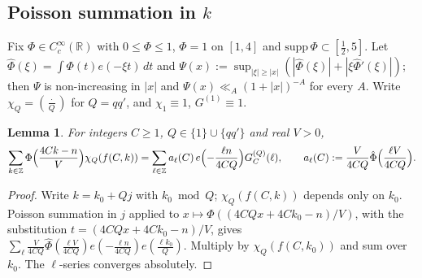 \documentclass[11pt,reqno]{amsart}
\newtheorem{lemma}[theorem]{Lemma}
\theoremstyle{definition}
\newcommand{\Z}{\mathbb Z}
\newcommand{\R}{\mathbb R}
\newcommand{\leg}[2]{\left(\frac{#1}{#2}\right)}
\begin{document}
\subsection{Poisson summation in $k$}
Fix $\Phi\in C_c^\infty(\R)$ with $0\le\Phi\le1$, $\Phi=1$ on $[1,4]$
and $\mathrm{supp}\,\Phi\subset[\frac12,5]$.  Let
$\hat\Phi(\xi)=\int\Phi(t)e(-\xi t)\,dt$ and
$\Psi(x):=\sup_{|\xi|\ge|x|}(|\hat\Phi(\xi)|+|\xi\hat\Phi'(\xi)|)$; then $\Psi$
is non-increasing in $|x|$ and $\Psi(x)\ll_A(1+|x|)^{-A}$ for every $A$.
Write $\chi_Q=\leg\cdot Q$ for $Q=qq'$, and $\chi_1\equiv1$,
$G^{(1)}\equiv1$.

\begin{lemma}\label{lem:poisson}
For integers $C\ge1$, $Q\in\{1\}\cup\{qq'\}$ and real $V>0$,
\[
 \sum_{k\in\Z}\Phi\Bigl(\frac{4Ck-n}V\Bigr)\chi_Q(f(C,k))
 =\sum_{\ell\in\Z}a_\ell(C)\,e\Bigl(-\frac{\ell n}{4CQ}\Bigr)G^{(Q)}_C(\ell),
 \qquad a_\ell(C):=\frac V{4CQ}\hat\Phi\Bigl(\frac{\ell V}{4CQ}\Bigr).
\]
\end{lemma}
\begin{proof}
Write $k=k_0+Qj$ with $k_0\bmod Q$; $\chi_Q(f(C,k))$ depends only on
$k_0$.  Poisson summation in $j$ applied to
$x\mapsto\Phi((4CQx+4Ck_0-n)/V)$, with the substitution
$t=(4CQx+4Ck_0-n)/V$, gives
$\sum_\ell\frac V{4CQ}\hat\Phi(\frac{\ell V}{4CQ})e(-\frac{\ell
n}{4CQ})e(\frac{\ell k_0}Q)$.  Multiply by $\chi_Q(f(C,k_0))$ and sum over
$k_0$.  The $\ell$-series converges absolutely.
\end{proof}
\end{document}
